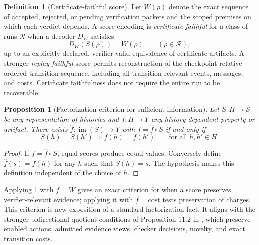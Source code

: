\documentclass[11pt,letterpaper]{article}
\newtheorem{proposition}[theorem]{Proposition}
\theoremstyle{definition}
\newtheorem{definition}[theorem]{Definition}
\theoremstyle{remark}
\begin{document}
\begin{definition}[Certificate-faithful score]
Let $W(\rho)$ denote the exact sequence of accepted, rejected, or pending verification packets and the scoped premises on which each verdict depends. A score encoding is \emph{certificate-faithful} for a class of runs $\mathcal R$ when a decoder $D_W$ satisfies
\[
D_W(S(\rho))=W(\rho)\qquad(\rho\in\mathcal R),
\]
up to an explicitly declared, verifier-valid equivalence of certificate artifacts. A stronger \emph{replay-faithful} score permits reconstruction of the checkpoint-relative ordered transition sequence, including all transition-relevant events, messages, and costs. Certificate faithfulness does not require the entire run to be recoverable.
\end{definition}

\begin{proposition}[Factorization criterion for sufficient information]\label{prop:factor}
Let $S:H\to\mathcal S$ be any representation of histories and $f:H\to Y$ any history-dependent property or artifact. There exists $\widehat f:\operatorname{im}(S)\to Y$ with $f=\widehat f\circ S$ if and only if
\[
S(h)=S(h')\Longrightarrow f(h)=f(h')\qquad\text{for all }h,h'\in H.
\]
\end{proposition}
\begin{proof}
If $f=\widehat f\circ S$, equal scores produce equal values. Conversely define $\widehat f(s)=f(h)$ for any $h$ such that $S(h)=s$. The hypothesis makes this definition independent of the choice of $h$.
\end{proof}

Applying \cref{prop:factor} with $f=W$ gives an exact criterion for when a score preserves verifier-relevant evidence; applying it with $f=\text{cost}$ tests preservation of charges. This criterion is new exposition of a standard factorization fact. It aligns with the stronger bidirectional quotient conditions of Proposition 11.2 in \cite{tenneson-dreaming}, which preserve enabled actions, admitted evidence views, checker decisions, novelty, and exact transition costs.
\end{document}
